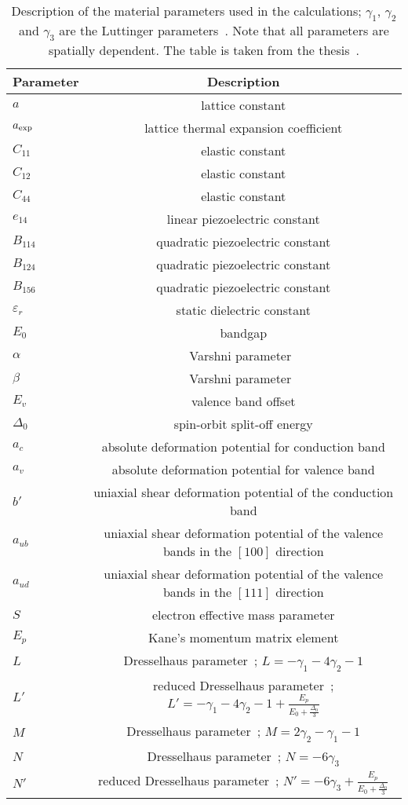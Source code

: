 \begin{table}[!ht]
	\begin{tabular}{lc}
		\hline \hline
		Parameter & Description\\
		\hline
		$a$& lattice constant\\
		$a_{\rm exp}$& lattice thermal expansion coefficient\\
		$C_{11}$& elastic constant\\
		$C_{12}$& elastic constant\\
		$C_{44}$& elastic constant\\
		$e_{14}$& linear piezoelectric constant\\
		$B_{114}$& quadratic piezoelectric constant\\
		$B_{124}$& quadratic piezoelectric constant\\
		$B_{156}$& quadratic piezoelectric constant\\
		$\varepsilon_{r}$& static dielectric constant\\
		$E_0$& bandgap\\
		$\alpha$& Varshni parameter~\citep{Varshni}\\
		$\beta$& Varshni parameter~\citep{Varshni}\\
		$E_v$& valence band offset\\
		$\Delta_0$& spin-orbit split-off energy\\
		$a_c$& absolute deformation potential for conduction band\\
		$a_v$& absolute deformation potential for valence band\\
		$b'$& uniaxial shear deformation potential of the conduction band\\
		$a_{ub}$& uniaxial shear deformation potential of the valence bands  in the $[100]$ direction\\
		$a_{ud}$& uniaxial shear deformation potential of the valence bands in the $[111]$ direction\\
		$S$& electron effective mass parameter\\
		$E_p$& Kane's momentum matrix element\\
		$L$& Dresselhaus parameter~\citep{Dress}; $L=-\gamma_1-4\gamma_2-1$\\
		$L'$& reduced Dresselhaus parameter~\citep{Dress}; $L'=- \gamma_1 - 4\gamma_2 - 1 + \frac{E_p}{E_0+\frac{\Delta_0}{3}}$\\
		$M$& Dresselhaus parameter~\citep{Dress}; $M=2\gamma_2 - \gamma_1  - 1$\\
		$N$& Dresselhaus parameter~\citep{Dress}; $N=-6\gamma_3$\\
		$N'$& reduced Dresselhaus parameter~\citep{Dress}; $N'=-6\gamma_3 + \frac{E_p}{E_0+\frac{\Delta_0}{3}}$\\
		\hline \hline
	\end{tabular}
	\caption{Description of the material parameters used in the calculations; $\gamma_1$, $\gamma_2$ and $\gamma_3$ are the Luttinger parameters~\citep{Lutt}. Note that all parameters are spatially dependent. The table is taken from the thesis~\citep{t_klenovsky}. \label{tDesc}}
\end{table}


